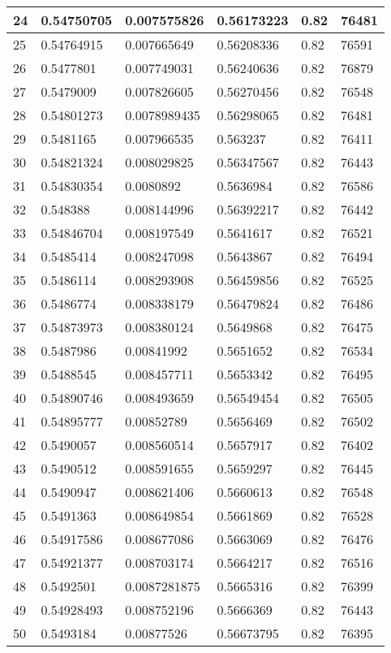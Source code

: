 \begin{longtable}{|l|l|l|l|l|l|}
24 & 0.54750705 & 0.007575826 & 0.56173223 & 0.82 & 76481 \\ \hline 
25 & 0.54764915 & 0.007665649 & 0.56208336 & 0.82 & 76591 \\ \hline 
26 & 0.5477801 & 0.007749031 & 0.56240636 & 0.82 & 76879 \\ \hline 
27 & 0.5479009 & 0.007826605 & 0.56270456 & 0.82 & 76548 \\ \hline 
28 & 0.54801273 & 0.0078989435 & 0.56298065 & 0.82 & 76481 \\ \hline 
29 & 0.5481165 & 0.007966535 & 0.563237 & 0.82 & 76411 \\ \hline 
30 & 0.54821324 & 0.008029825 & 0.56347567 & 0.82 & 76443 \\ \hline 
31 & 0.54830354 & 0.0080892 & 0.5636984 & 0.82 & 76586 \\ \hline 
32 & 0.548388 & 0.008144996 & 0.56392217 & 0.82 & 76442 \\ \hline 
33 & 0.54846704 & 0.008197549 & 0.5641617 & 0.82 & 76521 \\ \hline 
34 & 0.5485414 & 0.008247098 & 0.5643867 & 0.82 & 76494 \\ \hline 
35 & 0.5486114 & 0.008293908 & 0.56459856 & 0.82 & 76525 \\ \hline 
36 & 0.5486774 & 0.008338179 & 0.56479824 & 0.82 & 76486 \\ \hline 
37 & 0.54873973 & 0.008380124 & 0.5649868 & 0.82 & 76475 \\ \hline 
38 & 0.5487986 & 0.00841992 & 0.5651652 & 0.82 & 76534 \\ \hline 
39 & 0.5488545 & 0.008457711 & 0.5653342 & 0.82 & 76495 \\ \hline 
40 & 0.54890746 & 0.008493659 & 0.56549454 & 0.82 & 76505 \\ \hline 
41 & 0.54895777 & 0.00852789 & 0.5656469 & 0.82 & 76502 \\ \hline 
42 & 0.5490057 & 0.008560514 & 0.5657917 & 0.82 & 76402 \\ \hline 
43 & 0.5490512 & 0.008591655 & 0.5659297 & 0.82 & 76445 \\ \hline 
44 & 0.5490947 & 0.008621406 & 0.5660613 & 0.82 & 76548 \\ \hline 
45 & 0.5491363 & 0.008649854 & 0.5661869 & 0.82 & 76528 \\ \hline 
46 & 0.54917586 & 0.008677086 & 0.5663069 & 0.82 & 76476 \\ \hline 
47 & 0.54921377 & 0.008703174 & 0.5664217 & 0.82 & 76516 \\ \hline 
48 & 0.5492501 & 0.0087281875 & 0.5665316 & 0.82 & 76399 \\ \hline 
49 & 0.54928493 & 0.008752196 & 0.5666369 & 0.82 & 76443 \\ \hline 
50 & 0.5493184 & 0.00877526 & 0.56673795 & 0.82 & 76395 \\ \hline 
\end{longtable}